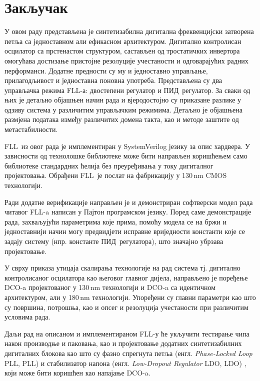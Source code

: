 \documentclass[master]{finthesis}
\makeatletter
\newcommand*{\engl}[2][\@empty]{%
    \edef\theacronym{#1}%
    (енгл. \foreignlanguage{english}{\emph{#2}%
    \ifx\theacronym\@empty \else , #1\fi})%
}
\def \FLL  {FLL} %
\def \DCO  {DCO} %
\def \PID  {ПИД} %
\makeatother
\begin{document}
\section{Закључак} \label{Conclusion}
У овом раду представљена је синтетизабилна дигитална фреквенцијски затворена петља са једноставном али ефикасном архитектуром. Дигитално контролисан осцилатор са прстенастом структуром, састављен од тростатичких инвертора омогућава достизање пристојне резолуције учестаности и одговарајућих радних перформанси. Додатне предности су му и једноставно управљање, прилагодљивост и једноставна поновна употреба. Представљена су два управљачка режима \FLL-а: двостепени регулатор и \PID\ регулатор. За сваки од њих је детаљно објашњен начин рада и вјеродостојно су приказане разлике у одзиву система у различитим управљачким режимима. Детаљно је објашњена размјена података између различитих домена такта, као и методе заштите од метастабилности. \par
\FLL\ из овог рада је имплементиран у SystemVerilog језику за опис хардвера. У зависности од технолошке библиотеке може бити направљен коришћењем само библиотеке стандардних ћелија без преуређивања у току дигиталног пројектовања. Обрађени \FLL\ је послат на фабрикацију у 130\,nm CMOS технологији. \par
Ради додатне верификације направљен је и демонстриран софтверски модел рада читавог \FLL-a написан у Пајтон програмском језику. Поред саме демонстрације рада, захваљујући параметрима које прима, помоћу модела се на бржи и једноставнији начин могу предвидјети исправне вриједности константи које се задају систему (нпр. константе \PID\ регулатора), што значајно убрзава пројектовање.\par
У сврху приказа утицаја скалирања технологије на рад система тј. дигитално контролисаног осцилатора као његовог главног дијела, направљено је поређење \DCO-a пројектованог у 130\,nm технологији и \DCO-a са идентичном архитектуром, али у 180\,nm технологији. Упоређени су главни параметри као што су површина, потрошња, као и опсег и резолуција учестаности при различитим условима рада. \par
Даљи рад на описаном и имплементираном \FLL-у ће укључити тестирање чипа након производње и паковања, као и пројектовање додатних синтетизабилних дигиталних блокова као што су фазно спрегнута петља \engl[PLL]{Phase-Locked Loop} и стабилизатор напона \engl[LDO]{Low-Dropout Regulator}, који може бити коришћен као напајање \DCO-a.


\makebibliography

\newrefsection
\nocite{*}
{\let\section\oldsection
\printbibliography[keyword=Frequency-locked loop, heading=bibintoc, title={Објављени радови}, resetnumbers]}
\end{document}
